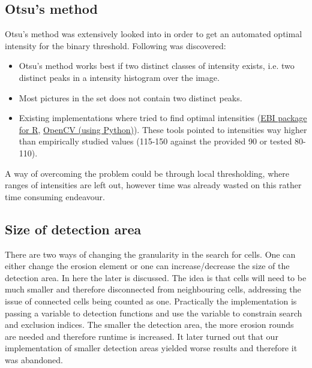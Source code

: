 \documentclass[a4paper, english]{article}
\numberwithin{equation}{section}
\begin{document}
\subsection{Otsu's method}\label{sec:otsu}
Otsu's method was extensively looked into in order to get an automated optimal intensity for the binary threshold. Following was discovered:
\begin{itemize}
    \item Otsu's method works best if two distinct classes of intensity exists, i.e. two distinct peaks in a intensity histogram over the image.
    \item Most pictures in the set does not contain two distinct peaks.
    \item Existing implementations where tried to find optimal intensities (\href{https://rdrr.io/bioc/EBImage/}{EBI package for R}, \href{https://opencv.org/}{OpenCV (using Python)}). These tools pointed to intensities way higher than empirically studied values (115-150 against the provided 90 or tested 80-110).
\end{itemize}
A way of overcoming the problem could be through local thresholding, where ranges of intensities are left out, however time was already wasted on this rather time consuming endeavour.
\subsection{Size of detection area}\label{sec:detect}
There are two ways of changing the granularity in the search for cells. One can either change the erosion element or one can increase/decrease the size of the detection area. In here the later is discussed. The idea is that cells will need to be much smaller and therefore disconnected from neighbouring cells, addressing the issue of connected cells being counted as one. Practically the implementation is passing a variable to detection functions and use the variable to constrain search and exclusion indices. The smaller the detection area, the more erosion rounds are needed and therefore runtime is increased. It later turned out that our implementation of smaller detection areas yielded worse results and therefore it was abandoned.
\end{document}

